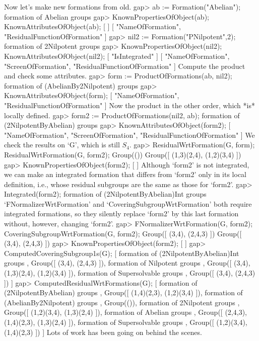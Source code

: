 Now let's make new formations from old.
\beginexample
gap> ab := Formation("Abelian");
formation of Abelian groups 
gap> KnownPropertiesOfObject(ab); KnownAttributesOfObject(ab);
[  ]
[ "NameOfFormation", "ResidualFunctionOfFormation" ]
gap> nil2 := Formation("PNilpotent",2);
formation of 2Nilpotent groups 
gap> KnownPropertiesOfObject(nil2); KnownAttributesOfObject(nil2);
[ "IsIntegrated" ]
[ "NameOfFormation", "ScreenOfFormation", "ResidualFunctionOfFormation" ]
\endexample
Compute the product and check some attributes.
\beginexample
gap> form := ProductOfFormations(ab, nil2);
formation of (AbelianBy2Nilpotent) groups 
gap> KnownAttributesOfObject(form);
[ "NameOfFormation", "ResidualFunctionOfFormation" ]
\endexample
Now the product in the other order, which *is* locally defined.
\beginexample
gap> form2 := ProductOfFormations(nil2, ab);
formation of (2NilpotentByAbelian) groups 
gap> KnownAttributesOfObject(form2);
[ "NameOfFormation", "ScreenOfFormation", "ResidualFunctionOfFormation" ]
\endexample
We check the results on `G', which is still $S_4$.
\beginexample
gap> ResidualWrtFormation(G, form);  ResidualWrtFormation(G, form2);
Group(())
Group([ (1,3)(2,4), (1,2)(3,4) ])
gap> KnownPropertiesOfObject(form2);
[  ]
\endexample
Although `form2' is not integrated, we can make an integrated formation
that differs from `form2' only in its local definition, i.e., whose
residual subgroups are the same as those for `form2'.
\beginexample
gap> Integrated(form2);
formation of (2NilpotentByAbelian)Int groups 
\endexample
`FNormalizerWrtFormation' and
`CoveringSubgroupWrtFormation' both require integrated formations, so they
silently replace `form2' by this last formation without, however,
changing `form2'. 
\beginexample
gap> FNormalizerWrtFormation(G, form2); CoveringSubgroupWrtFormation(G, form2);
Group([ (3,4), (2,4,3) ])
Group([ (3,4), (2,4,3) ])
gap> KnownPropertiesOfObject(form2);
[  ]
gap> ComputedCoveringSubgroup1s(G);
[ formation of (2NilpotentByAbelian)Int groups , Group([ (3,4), (2,4,3) ]), 
  formation of Nilpotent groups , Group([ (3,4), (1,3)(2,4), (1,2)(3,4) ]), 
  formation of Supersolvable groups , Group([ (3,4), (2,4,3) ]) ]
gap> ComputedResidualWrtFormations(G);
[ formation of (2NilpotentByAbelian) groups , 
  Group([ (1,4)(2,3), (1,2)(3,4) ]), 
  formation of (AbelianBy2Nilpotent) groups , Group(()), 
  formation of 2Nilpotent groups , Group([ (1,2)(3,4), (1,3)(2,4) ]), 
  formation of Abelian groups , Group([ (2,4,3), (1,4)(2,3), (1,3)(2,4) ]), 
  formation of Supersolvable groups , Group([ (1,2)(3,4), (1,4)(2,3) ]) ]
\endexample
Lots of work has been going on behind the scenes.

